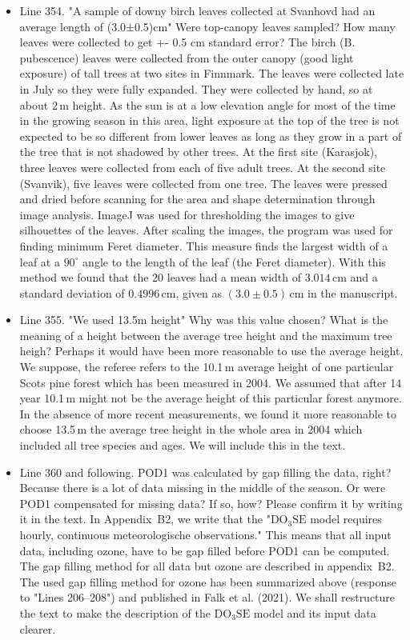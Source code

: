 \documentclass{scrartcl}
\begin{document}
\begin{itemize}
\item {\color{blue}Line 354. "A sample of downy birch leaves collected at Svanhovd had an average length of (3.0±0.5)cm" Were top-canopy leaves sampled? How many leaves were collected to get +- 0.5 cm standard error?}
The birch (B. pubescence) leaves were collected from the outer canopy (good light exposure) of tall trees at two sites in Finnmark. The leaves were collected late in July so they were fully expanded. They were collected by hand, so at about $2\,\mathrm{m}$ height. As the sun is at a low elevation angle for most of the time in the growing season in this area, light exposure at the top of the tree is not expected to be so different from lower leaves as long as they grow in a part of the tree that is not shadowed by other trees. At the first site (Karasjok), three leaves were collected from each of five adult trees. At the second site (Svanvik), five leaves were collected from one tree. The leaves were pressed and dried before scanning for the area and shape determination through image analysis. ImageJ was used for thresholding the images to give silhouettes of the leaves. After scaling the images, the program was used for finding minimum Feret diameter. This measure finds the largest width of a leaf at a $90^\circ$ angle to the length of the leaf (the Feret diameter). With this method we found that the 20 leaves had a mean width of $3.014\,\mathrm{cm}$ and a standard deviation of $0.4996\,\mathrm{cm}$, given as $(3.0\pm0.5)\,\mathrm{cm}$ in the manuscript.

\item {\color{blue}Line 355. "We used 13.5m height"
Why was this value chosen? What is the meaning of a height between the average tree
height and the maximum tree heigh? Perhaps it would have been more reasonable to use
the average height.}
We suppose, the referee refers to the 10.1\,m average height of one particular Scots pine forest which has been measured in 2004. We assumed that after 14 year 10.1\,m might not be the average height of this particular forest anymore. In the absence of more recent measurements, we found it more reasonable to choose 13.5\,m the average tree height in the whole area in 2004 which included all tree species and ages.
We will include this in the text.

\item {\color{blue}Line 360 and following. POD1 was calculated by gap filling the data, right? Because there is a lot of data missing in the middle of the season. Or were POD1 compensated for missing data? If so, how? Please confirm it by writing it in the text.}
In Appendix~B2, we write that the "$\mathrm{DO_3SE}$ model requires hourly, continuous meteorologische observations." This means that all input data, including ozone, have to be gap filled before POD1 can be computed. The gap filling method for all data but ozone are described in appendix~B2. The used gap filling method for ozone has been summarized above (response to "Lines 206--208") and published in Falk et al. (2021). We shall restructure the text to make the description of the $\mathrm{DO_3SE}$ model and its input data clearer.


\end{itemize}
\end{document}
